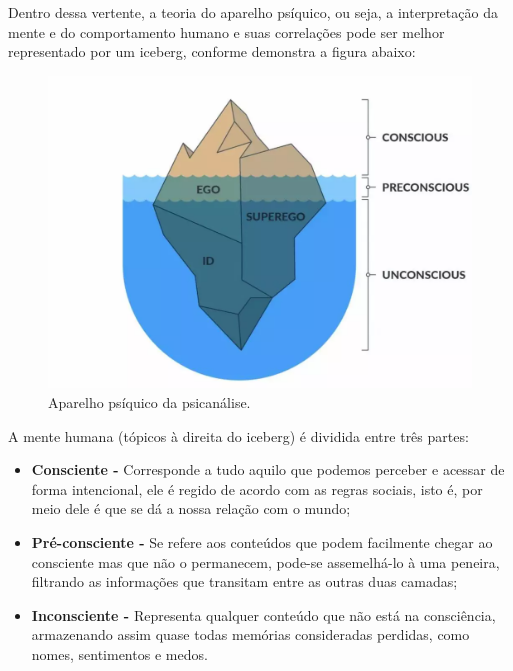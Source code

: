 Dentro dessa vertente, a teoria do aparelho psíquico, ou seja, a interpretação da mente e do comportamento humano e suas correlações pode ser melhor representado por um iceberg, conforme demonstra a figura abaixo:

\begin{figure}[H]
    \centering
    \caption{Aparelho psíquico da psicanálise.}
    \label{fig:aparelhoPsiquicoPsicanalise}
    \includegraphics[width=.8\textwidth]{data/figures/psicanalise.png}
\end{figure}

A mente humana (tópicos à direita do iceberg) é dividida entre três partes:
\begin{itemize}
    \item \textbf{Consciente -} Corresponde a tudo aquilo que podemos perceber e acessar de forma intencional, ele é regido de acordo com as regras sociais, isto é, por meio dele é que se dá a nossa relação com o mundo;
    \item \textbf{Pré-consciente -} Se refere aos conteúdos que podem facilmente chegar ao consciente mas que não o permanecem, pode-se assemelhá-lo à uma peneira, filtrando as informações que transitam entre as outras duas camadas;
    \item \textbf{Inconsciente -} Representa qualquer conteúdo que não está na consciência, armazenando assim quase todas memórias consideradas perdidas, como nomes, sentimentos e medos.
\end{itemize}

